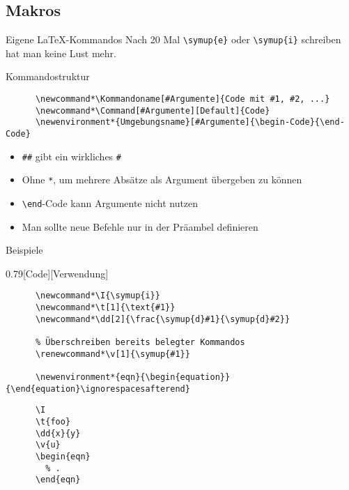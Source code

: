 \subsection{Makros}

\begin{frame}[fragile]{Eigene \LaTeX-Kommandos}
  Nach 20 Mal \lstinline+\symup{e}+ oder \lstinline+\symup{i}+ schreiben hat man keine Lust mehr.
  \vspace{1em}
  \begin{block}{Kommandostruktur}
    \begin{lstlisting}
      \newcommand*\Kommandoname[#Argumente]{Code mit #1, #2, ...}
      \newcommand*\Command[#Argumente][Default]{Code}
      \newenvironment*{Umgebungsname}[#Argumente]{\begin-Code}{\end-Code}
    \end{lstlisting}
  \end{block}
  \begin{itemize}
    \item \verb+##+ gibt ein wirkliches \verb+#+
    \item Ohne \texttt{*}, um mehrere Absätze als Argument übergeben zu können
    \item \lstinline+\end+-Code kann Argumente nicht nutzen
    \item Man sollte neue Befehle nur in der Präambel definieren
  \end{itemize}
\end{frame}

\begin{frame}[fragile]{Beispiele}
  \begin{CodeExample}{0.79}[Code][Verwendung]
    \begin{lstlisting}
      \newcommand*\I{\symup{i}}
      \newcommand*\t[1]{\text{#1}}
      \newcommand*\dd[2]{\frac{\symup{d}#1}{\symup{d}#2}}

      % Überschreiben bereits belegter Kommandos
      \renewcommand*\v[1]{\symup{#1}}

      \newenvironment*{eqn}{\begin{equation}}{\end{equation}\ignorespacesafterend}
    \end{lstlisting}
  \CodeResult
    \begin{lstlisting}
      \I
      \t{foo}
      \dd{x}{y}
      \v{u}
      \begin{eqn}
        % .
      \end{eqn}
    \end{lstlisting}
  \end{CodeExample}
\end{frame}

